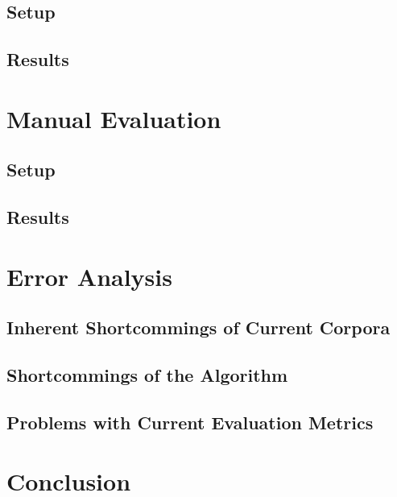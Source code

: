 \documentclass[a4paper,BCOR=10mm]{report}
\begin{document}
\section{Setup}

\section{Results}

\chapter{Manual Evaluation}

\section{Setup}

\section{Results}

\chapter{Error Analysis}

\section{Inherent Shortcommings of Current Corpora}

\section{Shortcommings of the Algorithm}

\section{Problems with Current Evaluation Metrics}

\chapter{Conclusion}
\end{document}
